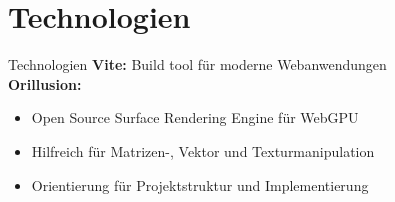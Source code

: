 \section{Technologien}
\begin{frame}{Technologien}
\textbf{Vite:} Build tool für moderne Webanwendungen \\
\vspace{1em}
\textbf{Orillusion:} 
\begin{itemize}
    \item Open Source Surface Rendering Engine für WebGPU
    \item Hilfreich für Matrizen-, Vektor und Texturmanipulation
    \item Orientierung für Projektstruktur und Implementierung
\end{itemize}
\end{frame}